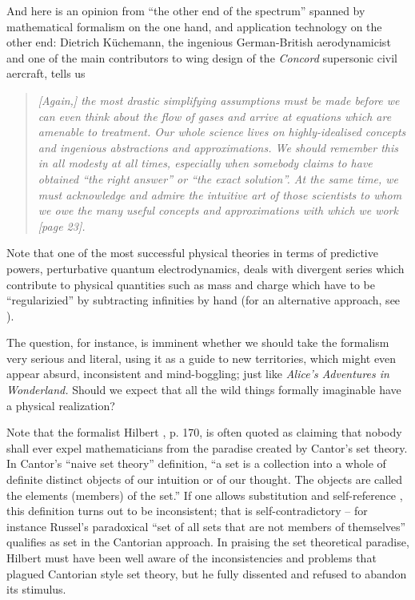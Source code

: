 And here is an opinion from ``the other end of the spectrum'' spanned by mathematical formalism on the one hand,
and application technology on the other end:
Dietrich K\"uchemann,
the ingenious German-British aerodynamicist and
one of the main contributors to wing design of the {\em Concord} supersonic civil aercraft, tells us
\cite{Kuchemann}
\begin{quote}
{\em
[Again,] the most drastic simplifying assumptions must be made before we can even think about
the flow of gases and arrive at equations which are amenable to treatment. Our whole
science lives on highly-idealised concepts and ingenious abstractions and approximations.
We should remember this in all modesty at all times, especially when somebody claims to
have obtained ``the right answer'' or ``the exact solution''.
At the same time, we must acknowledge and admire the intuitive art of those scientists
to whom we owe the many useful concepts and approximations with which we work [page 23].
}
\end{quote}

Note that one of the most successful physical theories in terms of predictive powers,
perturbative quantum electrodynamics,
deals with divergent series \cite{PhysRev.85.631}
which contribute to physical quantities such as mass and charge
which have to be ``regularizied'' by subtracting infinities by hand
(for an alternative approach, see \cite{scharf-finiteQED}).

The question, for instance, is imminent whether we should take the formalism very serious and literal,
using it as a guide to new territories, which might even appear absurd, inconsistent and mind-boggling;
just like {\em Alice's Adventures in Wonderland.}
Should we expect that all the wild things formally imaginable have a physical realization?

Note that the formalist Hilbert \cite{hilbert-26,cantor-set}, p. 170, is often quoted as claiming that
nobody shall  ever expel mathematicians from the paradise created by Cantor's set theory.
In Cantor's ``naive set theory'' definition,
``a set is a collection into a whole of definite distinct objects of
our intuition or of our thought. The objects are called the elements
(members) of the set.''
If one allows  substitution and self-reference \cite{smullyan-78,smullyan-92},
this definition turns out to be inconsistent; that is self-contradictory
--
for instance Russel's paradoxical ``set of all sets that are not members of themselves''
qualifies as set in the Cantorian approach.
In praising the set theoretical paradise, Hilbert must have been well aware of the inconsistencies
and problems that plagued Cantorian style set theory,
but he fully dissented and refused to abandon its stimulus.


